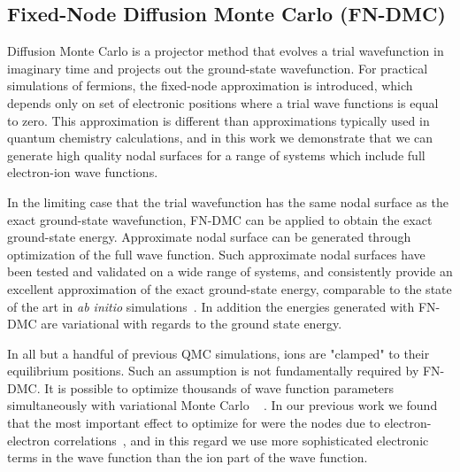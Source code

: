 \subsection{Fixed-Node Diffusion Monte Carlo (FN-DMC)}
Diffusion Monte Carlo is a projector method that evolves a trial wavefunction in imaginary time and projects out the ground-state wavefunction.  For practical simulations of fermions, the fixed-node approximation is introduced, which depends only on set of electronic positions where a trial wave functions is equal to zero.  This approximation is different than approximations typically used in quantum chemistry calculations, and in this work we demonstrate that we can generate high quality nodal surfaces for a range of systems which include full electron-ion wave functions. 

In the limiting case that  the trial wavefunction has the same nodal surface as the exact ground-state wavefunction, FN-DMC can be applied to obtain the exact ground-state energy.  Approximate nodal surface can be generated through optimization of the full wave function. Such approximate nodal surfaces have been tested and validated on a wide range of systems, and consistently provide an excellent approximation of the exact ground-state energy,  comparable to the state of the art in \textit{ab initio} simulations~\cite{grossman1}. In addition the energies generated with FN-DMC are variational with regards to the ground state energy.

In all but a handful of previous QMC simulations,  ions are "clamped" to their equilibrium positions. Such an assumption is not fundamentally required by FN-DMC.  It is possible to optimize thousands of wave function parameters simultaneously with variational Monte Carlo ~\cite{Nightingale_Linear,Umrigar_Linear,Brown_Bench} .   In our previous work we found that the most important effect to optimize for were the nodes due to electron-electron correlations~\cite{Tubman_ECG}, and in this regard we use more sophisticated electronic terms in the wave function than the ion part of the wave function.

